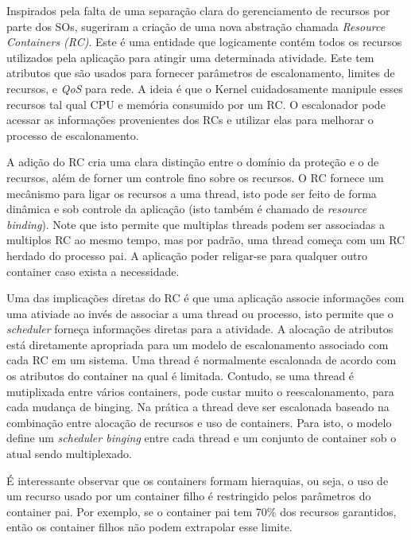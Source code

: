 Inspirados pela falta de uma separação clara do gerenciamento de recursos por
parte dos SOs, \cite{resourcecontainers} sugeriram a criação de uma nova
abstração chamada \emph{Resource Containers (RC)}. Este é uma entidade que
logicamente contém todos os recursos utilizados pela aplicação para atingir uma
determinada atividade. Este tem atributos que são usados para fornecer
parâmetros de escalonamento, limites de recursos, e \emph{QoS} para rede. A
ideia é que o Kernel cuidadosamente manipule esses recursos tal qual CPU e
memória consumido por um RC. O escalonador pode acessar as informações
provenientes dos RCs e utilizar elas para melhorar o processo de escalonamento.

A adição do RC cria uma clara distinção entre o domínio da proteção e o de
recursos, além de forner um controle fino sobre os recursos. O RC fornece um
mecânismo para ligar os recursos a uma thread, isto pode ser feito de forma
dinâmica e sob controle da aplicação (isto também é chamado de \emph{resource
binding}). Note que isto permite que multiplas threads podem ser associadas a
multiplos RC ao mesmo tempo, mas por padrão, uma thread começa com um RC
herdado do processo pai. A aplicação poder religar-se para qualquer outro
container caso exista a necessidade.

Uma das implicações diretas do RC é que uma aplicação associe informações com
uma ativiade ao invés de associar a uma thread ou processo, isto permite que
o \emph{scheduler} forneça informações diretas para a atividade.
A alocação de atributos está diretamente apropriada para um modelo de
escalonamento associado com cada RC em um sistema. Uma thread é normalmente
escalonada de acordo com os atributos do container na qual é limitada. Contudo,
se uma thread é mutiplixada entre vários containers, pode custar muito o
reescalonamento, para cada mudança de binging. Na prática a thread deve ser
escalonada baseado na combinação entre alocação de recursos e uso de
containers. Para isto, o modelo define um \emph{scheduler binging} entre cada
thread e um conjunto de container sob o atual sendo multiplexado. 

É interessante observar que os containers formam hieraquias, ou seja, o uso de
um recurso usado por um container filho é restringido pelos parâmetros do
container pai. Por exemplo, se o container pai tem 70\% dos recursos
garantidos, então os container filhos não podem extrapolar esse limite.

